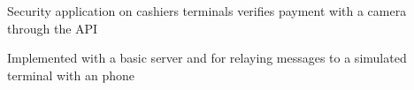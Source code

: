 \sectionsep

\begin{tightemize}
\item Security application on cashiers terminals verifies payment with a camera through the  API
\item Implemented with a basic  server and  for relaying messages to a simulated terminal with an   phone
\end{tightemize}

